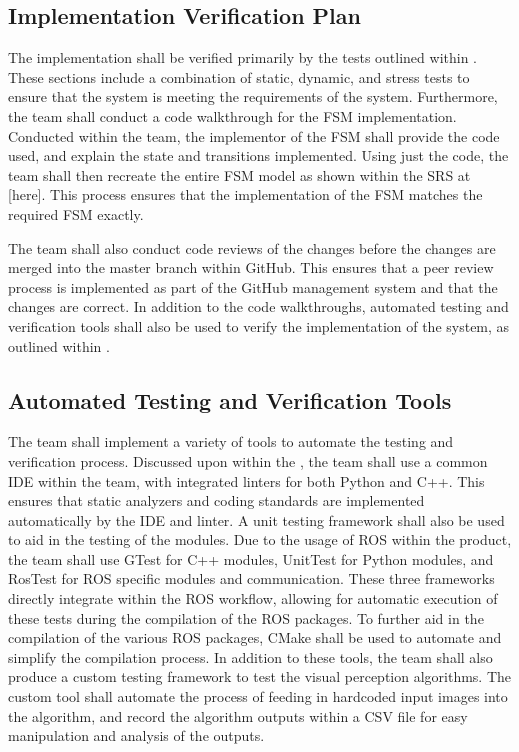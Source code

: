 \documentclass[12pt, titlepage]{article}
\begin{document}
\subsection{Implementation Verification Plan}

The implementation shall be verified primarily by the tests outlined within . These sections include a combination of static, dynamic, and stress tests to ensure that the system is meeting the requirements of the system. Furthermore, the team shall conduct a code walkthrough for the FSM implementation. Conducted within the team, the implementor of the FSM shall provide the code used, and explain the state and transitions implemented. Using just the code, the team shall then recreate the entire FSM model as shown within the SRS at [here]. This process ensures that the implementation of the FSM matches the required FSM exactly.  

The team shall also conduct code reviews of the changes before the changes are merged into the master branch within GitHub. This ensures that a peer review process is implemented as part of the GitHub management system and that the changes are correct. In addition to the code walkthroughs, automated testing and verification tools shall also be used to verify the implementation of the system, as outlined within . 


\subsection{Automated Testing and Verification Tools}
\label{automatedVerificationTools}

The team shall implement a variety of tools to automate the testing and verification process. Discussed upon within the , the team shall use a common IDE within the team, with integrated linters for both Python and C++. This ensures that static analyzers and coding standards are implemented automatically by the IDE and linter. A unit testing framework shall also be used to aid in the testing of the modules. Due to the usage of ROS within the product, the team shall use GTest for C++ modules, UnitTest for Python modules, and RosTest for ROS specific modules and communication. These three frameworks directly integrate within the ROS workflow, allowing for automatic execution of these tests during the compilation of the ROS packages. To further aid in the compilation of the various ROS packages, CMake shall be used to automate and simplify the compilation process. In addition to these tools, the team shall also produce a custom testing framework to test the visual perception algorithms. The custom tool shall automate the process of feeding in hardcoded input images into the algorithm, and record the algorithm outputs within a CSV file for easy manipulation and analysis of the outputs. 
\end{document}

